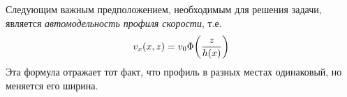 
Следующим важным предположением, необходимым для решения задачи, является \textit{автомодельность профиля скорости},
т.е.
\begin{equation}
    v_x (x,z) = v_0 \Phi\qty(\frac{z}{h(x)})
\end{equation}
Эта формула отражает тот факт, что профиль в разных местах одинаковый, 
но меняется его ширина.


